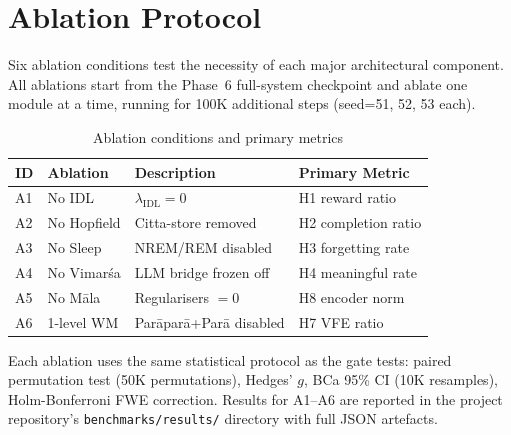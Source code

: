 \documentclass[journal,onecolumn,11pt]{IEEEtran}
\begin{document}
\section{Ablation Protocol}\label{app:ablations}

Six ablation conditions test the necessity of each major architectural component.
All ablations start from the Phase~6 full-system checkpoint and ablate one
module at a time, running for 100K additional steps (seed=51, 52, 53 each).

\begin{table}[h]
  \caption{Ablation conditions and primary metrics}
  \label{tab:ablations}
  \centering\small
  \begin{tabular}{llp{3cm}l}
    \toprule
    ID & Ablation & Description & Primary Metric \\
    \midrule
    A1 & No IDL & $\lambda_{\text{IDL}} = 0$ & H1 reward ratio \\
    A2 & No Hopfield & Citta-store removed & H2 completion ratio \\
    A3 & No Sleep & NREM/REM disabled & H3 forgetting rate \\
    A4 & No Vimarśa & LLM bridge frozen off & H4 meaningful rate \\
    A5 & No Māla & Regularisers $= 0$ & H8 encoder norm \\
    A6 & 1-level WM & Parāparā+Parā disabled & H7 VFE ratio \\
    \bottomrule
  \end{tabular}
\end{table}

Each ablation uses the same statistical protocol as the gate tests:
paired permutation test (50K permutations), Hedges' $g$,
BCa 95\% CI (10K resamples), Holm-Bonferroni FWE correction.
Results for A1--A6 are reported in the project repository's
\texttt{benchmarks/results/} directory with full JSON artefacts.



\end{document}
